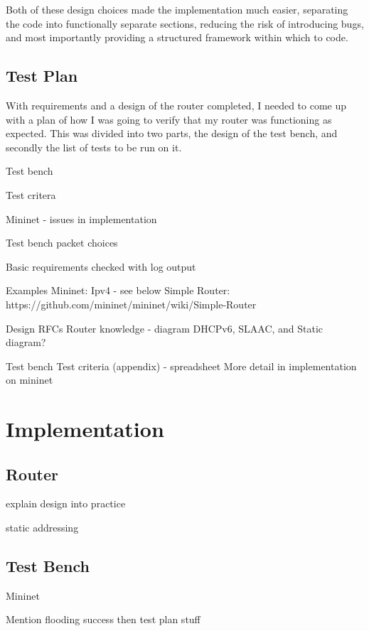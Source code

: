 \documentclass[12pt,a4paper,twoside,openright]{report}
\begin{document}
\bigskip

Both of these design choices made the implementation much easier, separating the code into functionally separate sections, reducing the risk of introducing bugs, and most importantly providing a structured framework within which to code.

\section{Test Plan}

With requirements and a design of the router completed, I needed to come up with a plan of how I was going to verify that my router was functioning as expected.  This was divided into two parts, the design of the test bench, and secondly the list of tests to be run on it.

\bigskip

Test bench

\bigskip

Test critera

Mininet - issues in implementation

Test bench packet choices

Basic requirements checked with log output

Examples
Mininet: Ipv4 - see below
Simple Router: https://github.com/mininet/mininet/wiki/Simple-Router

Design
RFCs
Router knowledge - diagram
DHCPv6, SLAAC, and Static diagram?

Test bench
Test criteria (appendix) - spreadsheet
More detail in implementation on mininet


\chapter{Implementation}
\label{chap::implementation}

\section{Router}

explain design into practice

static addressing

\section{Test Bench}

Mininet

Mention flooding success then test plan stuff
\end{document}

